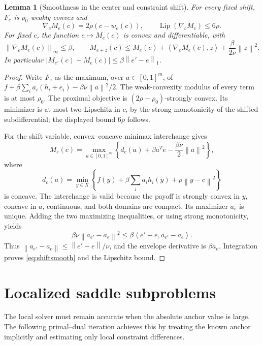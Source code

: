 \documentclass[11pt,a4paper]{article}
\newcommand{\norm}[1]{\left\lVert#1\right\rVert}
\newcommand{\ip}[2]{\left\langle#1,#2\right\rangle}
\newtheorem{lemma}[theorem]{Lemma}
\theoremstyle{remark}
\numberwithin{equation}{section}
\begin{document}
\begin{lemma}[Smoothness in the center and constraint shift]\label{lem:smoothness}
For every fixed shift, $F_e$ is $\rho_0$-weakly convex and
\[
 \nabla_c M_e(c)=2\rho(c-w_e(c)),\qquad
 \operatorname{Lip}(\nabla_c M_e)\le6\rho.
\]
For fixed $c$, the function $e\mapsto M_e(c)$ is convex and differentiable, with
\begin{equation}
 \norm{\nabla_e M_e(c)}_\infty\le\beta,
 \qquad
 M_{e+z}(c)\le M_e(c)+\ip{\nabla_e M_e(c)}z+
 \frac{\beta}{2\nu}\norm z^2.
 \label{eq:shiftsmooth}
\end{equation}
In particular $|M_{e'}(c)-M_e(c)|\le\beta\norm{e'-e}_1$.
\end{lemma}
\begin{proof}
Write $F_e$ as the maximum, over $a\in[0,1]^m$, of $f+\beta\sum_i a_i(h_i+e_i)-\beta\nu\norm a^2/2$. The weak-convexity modulus of every term is at most $\rho_0$. The proximal objective is $(2\rho-\rho_0)$-strongly convex. Its minimizer is at most two-Lipschitz in $c$, by the strong monotonicity of the shifted subdifferential; the displayed bound $6\rho$ follows.

For the shift variable, convex--concave minimax interchange gives
\[
 M_e(c)=\max_{a\in[0,1]^m}\left\{d_c(a)+\beta a^T e-\frac{\beta\nu}{2}\norm a^2\right\},
\]
where
\[
 d_c(a)=\min_{y\in X}\left\{f(y)+\beta\sum_i a_i h_i(y)+\rho\norm{y-c}^2\right\}
\]
is concave. The interchange is valid because the payoff is strongly convex in $y$, concave in $a$, continuous, and both domains are compact. Its maximizer $a_e$ is unique. Adding the two maximizing inequalities, or using strong monotonicity, yields
\[
 \beta\nu\norm{a_{e'}-a_e}^2\le\beta\ip{e'-e}{a_{e'}-a_e}.
\]
Thus $\norm{a_{e'}-a_e}\le\norm{e'-e}/\nu$, and the envelope derivative is $\beta a_e$. Integration proves \eqref{eq:shiftsmooth} and the Lipschitz bound.
\end{proof}

\section{Localized saddle subproblems}\label{sec:local}
The local solver must remain accurate when the absolute anchor value is large. The following primal--dual iteration achieves this by treating the known anchor implicitly and estimating only local constraint differences.
\end{document}
